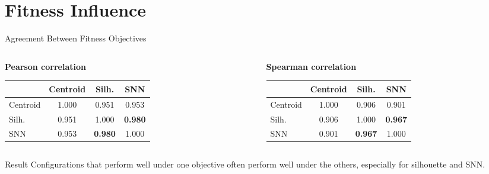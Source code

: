\documentclass[aspectratio=169,10pt]{beamer}
\begin{document}
\section{Fitness Influence}

\begin{frame}{Agreement Between Fitness Objectives}
  \begin{columns}[T]
    \begin{column}{0.49\textwidth}
      \textbf{Pearson correlation}
      \begin{adjustbox}{max width=\textwidth}
      \begin{tabular}{lccc}
        \toprule
        & Centroid & Silh. & SNN \\
        \midrule
        Centroid & 1.000 & 0.951 & 0.953 \\
        Silh. & 0.951 & 1.000 & \textbf{0.980} \\
        SNN & 0.953 & \textbf{0.980} & 1.000 \\
        \bottomrule
      \end{tabular}
      \end{adjustbox}
    \end{column}
    \begin{column}{0.49\textwidth}
      \textbf{Spearman correlation}
      \begin{adjustbox}{max width=\textwidth}
      \begin{tabular}{lccc}
        \toprule
        & Centroid & Silh. & SNN \\
        \midrule
        Centroid & 1.000 & 0.906 & 0.901 \\
        Silh. & 0.906 & 1.000 & \textbf{0.967} \\
        SNN & 0.901 & \textbf{0.967} & 1.000 \\
        \bottomrule
      \end{tabular}
      \end{adjustbox}
    \end{column}
  \end{columns}

  \vspace{0.8em}
  \begin{block}{Result}
    Configurations that perform well under one objective often perform well under the others, especially for silhouette and SNN.
  \end{block}
\end{frame}
\end{document}
